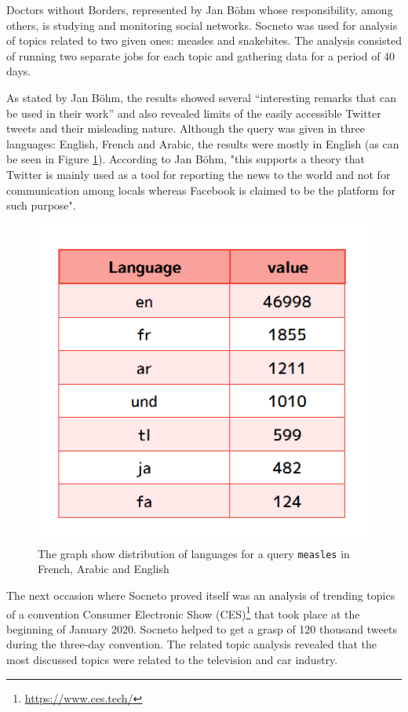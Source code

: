 Doctors without Borders, represented by Jan Böhm whose responsibility, among others, is studying and monitoring social networks. Socneto was used for analysis of topics related to two given ones: measles and snakebites. The analysis consisted of running two separate jobs for each topic and gathering data for a period of 40 days. 

As stated by Jan Böhm, the results showed several ``interesting remarks that can be used in their work''  and also revealed limits of the easily accessible Twitter tweets and their misleading nature. Although the query was given in three languages: English, French and Arabic, the results were mostly in English (as can be seen in Figure \ref{figure:msf_lang}). According to Jan Böhm, "this supports a theory that Twitter is mainly used as a tool for reporting the news to the world and not for communication among locals whereas Facebook is claimed to be the platform for such purpose". 

\begin{figure}
    \centering
    \includegraphics[scale=0.7]{diagrams/po_msf_lang.png}
    \caption{The graph show distribution of languages for a query \texttt{measles} in French, Arabic and English}
    \label{figure:msf_lang}
\end{figure}

The next occasion where Socneto proved itself was an analysis of trending topics of a convention Consumer Electronic Show (CES)\footnote{\url{https://www.ces.tech/}} that took place at the beginning of January 2020. Socneto helped to get a grasp of 120 thousand tweets during the three-day convention. The related topic analysis revealed that the most discussed topics were related to the television and car industry.

